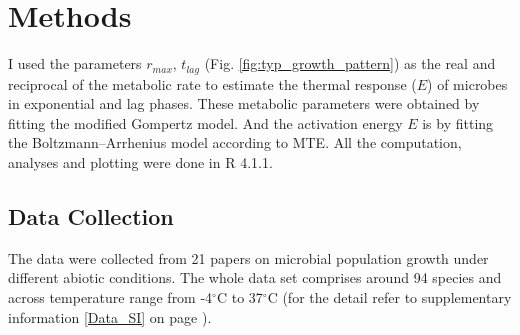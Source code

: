 \documentclass[a4paper]{article}
\begin{document}



\section{Methods}

I used the parameters $r_{max}$, $t_{lag}$ (Fig. \ref{fig:typ_growth_pattern}) as the real and reciprocal of the metabolic rate to estimate the thermal response ($E$) of microbes in exponential and lag phases. These metabolic parameters were obtained by fitting the modified Gompertz model. And the activation energy $E$ is by fitting the Boltzmann–Arrhenius model according to MTE. All the computation, analyses and plotting were done in R 4.1.1.\\

\subsection{Data Collection}

The data were collected from 21 papers on microbial population growth under different abiotic conditions. The whole data set comprises around 94 species and across temperature range from -4$^{\circ}$C to 37$^{\circ}$C (for the detail refer to supplementary information \ref{Data_SI} on page \pageref{Data_SI}).\\
\end{document}
